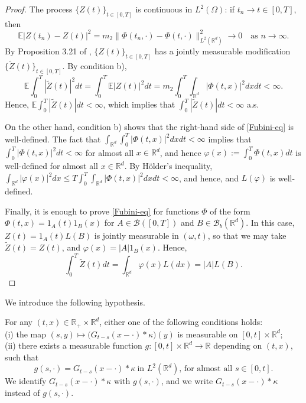 \documentclass[12pt]{article}
\def\cB{\mathcal{B}}
\def\bE{\mathbb{E}}
\def\bR{\mathbb{R}}
\def\k{\kappa}
\begin{document}
\begin{proof} 
The process
$\{Z(t)\}_{t \in [0,T]}$ is continuous in $L^2(\Omega)$: if $t_n \to t \in [0,T]$, then
\[
\bE|Z(t_n)-Z(t)|^2=m_2 \| \Phi(t_n,\cdot)-\Phi(t,\cdot) \|_{L^2(\bR^d)}^2  \to 0 \quad \mbox{as $n \to \infty$}. 
\]
By Proposition 3.21 of \cite{PZ07}, $\{Z(t)\}_{t \in [0,T]}$ has a jointly measurable modification
$\{\widetilde{Z}(t)\}_{t \in [0,T]}$. By condition b),
\[
\bE \int_0^T |\widetilde{Z}(t)|^2 dt=\int_0^T \bE|Z(t)|^2 dt=m_2\int_0^T \int_{\bR^d}|\Phi(t,x)|^2 dxdt<\infty.
\]
Hence, $\bE \int_0^T |\widetilde{Z}(t)| dt<\infty$, which implies that $\int_0^T |\widetilde{Z}(t)| dt<\infty$ a.s.

\medskip


On the other hand, condition b) shows that the right-hand side of \eqref{Fubini-eq} is well-defined. The fact that $\int_{\bR^d}\int_0^T |\Phi(t,x)|^2 dxdt<\infty$ implies that $\int_0^T |\Phi(t,x)|^2 dt<\infty$ for almost all $x \in \bR^d$, and hence $\varphi(x):=\int_0^T\Phi(t,x)dt$ is well-defined for almost all $x \in \bR^d$. By H\"older's inequality,
$\int_{\bR^d}|\varphi(x)|^2 dx \leq T \int_0^T \int_{\bR^d}|\Phi(t,x)|^2 dxdt<\infty$, and hence, and $L(\varphi)$ is well-defined.

\medskip

Finally, it is enough to prove \eqref{Fubini-eq} for functions $\Phi$ of the form $\Phi(t,x)=1_A(t) 1_B(x)$ for $A \in \cB([0,T])$ and $B \in \cB_b(\bR^d)$. In this case, $Z(t)=1_A(t) L(B)$ is jointly measurable in $(\omega,t)$, so that we may take $\widetilde{Z}(t)=Z(t)$, and $\varphi(x)=|A|1_B(x)$. Hence,
\[
\int_0^T \widetilde{Z}(t)dt=\int_{\bR^d}\varphi(x) L(dx)=|A|L(B).
\]

\end{proof}

We introduce the following hypothesis.

\medskip

For any $(t,x)\in \bR_{+} \times \bR^d$, either one of the following conditions holds:\\
(i) the map $(s,y) \mapsto \big(G_{t-s}(x-\cdot)*\k\big)(y)$ is measurable on $[0,t] \times \bR^d$; \\
(ii) there exists a measurable function $g:[0,t] \times \bR^d \to \bR$ depending on $(t,x)$, such that 
\begin{equation}
\label{G*k-meas}
g(s,\cdot)= G_{t-s}(x-\cdot)*\k \ \mbox{in $L^2(\bR^d)$, \  for almost all $s \in [0,t]$}.
\end{equation}
We identify $G_{t-s}(x-\cdot)*\k$ with $g(s,\cdot)$, and we write $G_{t-s}(x-\cdot)*\k$ instead of $g(s,\cdot)$.
\end{document}
